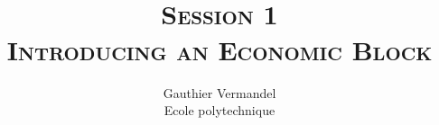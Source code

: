 \documentclass[xcolor=x11names,compress,aspectratio=169]{beamer}%
\newif\ifshowslide
\begin{document}
%
\title[\SHORTNAME]{
\textsc{\footnotesize\SHORTNAME\\ Session 1\\[0.35em] \Large Introducing an Economic Block}
\\
}
\author{ Gauthier Vermandel\\
{\footnotesize Ecole polytechnique}}
\date{}%
%

\begin{frame}%
%

\maketitle
%

\transboxout
\end{frame}%
%

\ifshowslide
%
\end{document}
